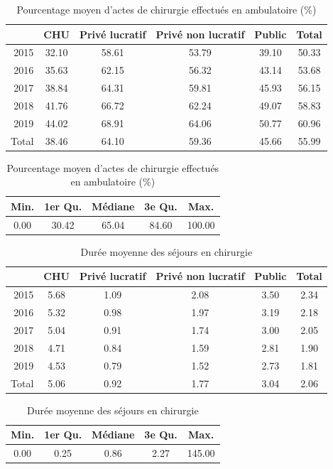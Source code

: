 \begin{table}[ht]
\centering
\caption{Pourcentage moyen d'actes de chirurgie effectués en ambulatoire (\%)} 
\label{part_ambu_tabu_chir}
\begin{tabular}{r|cccc|c}
  \hline
 & CHU & Privé lucratif & Privé non lucratif & Public & Total \\ 
  \hline
2015 & 32.10 & 58.61 & 53.79 & 39.10 & 50.33 \\ 
  2016 & 35.63 & 62.15 & 56.32 & 43.14 & 53.68 \\ 
  2017 & 38.84 & 64.31 & 59.81 & 45.93 & 56.15 \\ 
  2018 & 41.76 & 66.72 & 62.24 & 49.07 & 58.83 \\ 
  2019 & 44.02 & 68.91 & 64.06 & 50.77 & 60.96 \\ 
  \hline
  Total & 38.46 & 64.10 & 59.36 & 45.66 & 55.99 \\ 
   \hline
\end{tabular}

\bigskip

\begin{tabular}{ccccc}
  \hline
Min. & 1er Qu. & Médiane & 3e Qu. & Max. \\ 
  \hline
0.00 & 30.42 & 65.04 & 84.60 & 100.00 \\ 
   \hline
\end{tabular}
\end{table}


\begin{table}[!ht]
\centering
\caption{Durée moyenne des séjours en chirurgie} 
\label{dms_tabu_chir}
\begin{tabular}{r|cccc|c}
  \hline
 & CHU & Privé lucratif & Privé non lucratif & Public & Total \\ 
  \hline
2015 & 5.68 & 1.09 & 2.08 & 3.50 & 2.34 \\ 
  2016 & 5.32 & 0.98 & 1.97 & 3.19 & 2.18 \\ 
  2017 & 5.04 & 0.91 & 1.74 & 3.00 & 2.05 \\ 
  2018 & 4.71 & 0.84 & 1.59 & 2.81 & 1.90 \\ 
  2019 & 4.53 & 0.79 & 1.52 & 2.73 & 1.81 \\
  \hline
  Total & 5.06 & 0.92 & 1.77 & 3.04 & 2.06 \\ 
   \hline
\end{tabular}

\bigskip

\begin{tabular}{ccccc}
  \hline
Min. & 1er Qu. & Médiane & 3e Qu. & Max. \\ 
  \hline
0.00 & 0.25 & 0.86 & 2.27 & 145.00 \\ 
   \hline
\end{tabular}
\end{table}

